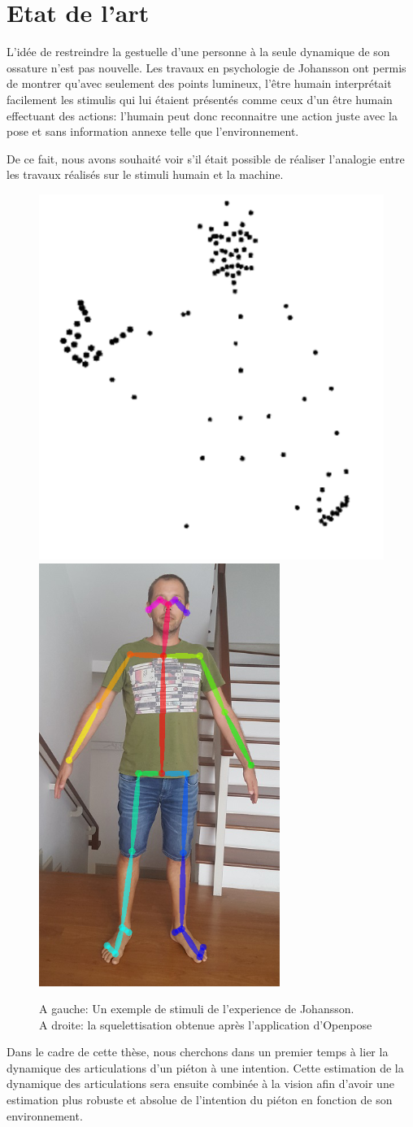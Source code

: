 \chapter{Etat de l'art}
\label{sec:SOTA}

L'idée de restreindre la gestuelle d'une personne à la seule dynamique de son ossature n'est pas nouvelle.
Les travaux en psychologie de Johansson  \cite{johansson1973visual,johansson1976spatio} ont permis de montrer qu'avec seulement des points lumineux, l'être humain interprétait facilement les stimulis qui lui étaient présentés comme ceux d'un être humain effectuant des actions: l'humain peut donc reconnaitre une action juste avec la pose et sans information annexe telle que l'environnement. 

De ce fait, nous avons souhaité voir s'il était possible de réaliser l'analogie entre les travaux réalisés sur le stimuli humain et la machine.

\begin{figure}[H]
    \centering
    \includegraphics[width=0.34\linewidth]{Images/Johansson.png}
    \includegraphics[width=0.2\linewidth]{Images/openpose2.png}
    \caption{A gauche: Un exemple de stimuli de l'experience de Johansson.\\ A droite: la squelettisation obtenue après l'application d'Openpose \cite{cao2017realtime}}
    \label{fig:Johansson}
\end{figure}

Dans le cadre de cette thèse, nous cherchons dans un premier temps à lier la dynamique des articulations d'un piéton à une intention. Cette estimation de la dynamique des articulations sera ensuite combinée à la vision afin d’avoir une estimation plus robuste et absolue de l'intention du piéton en fonction de son environnement.\\





